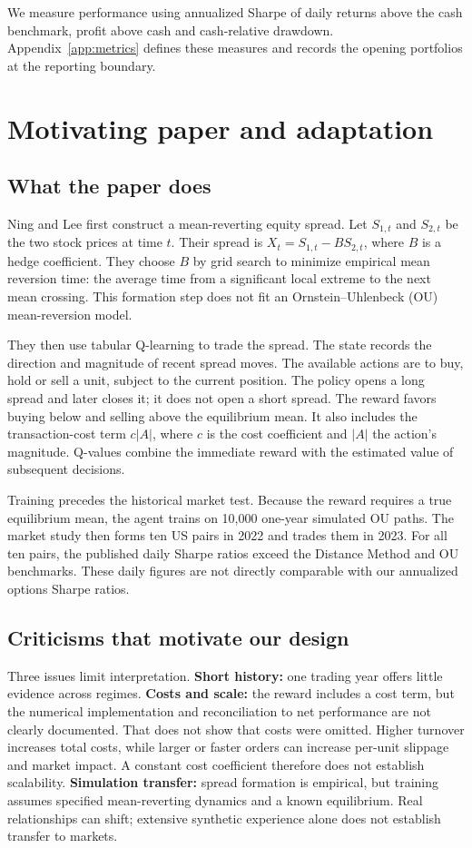 \documentclass[11pt,letterpaper]{article}
\begin{document}
We measure performance using annualized Sharpe of daily returns above the
cash benchmark, profit above cash and cash-relative drawdown.
Appendix~\ref{app:metrics} defines these measures and records the opening
portfolios at the reporting boundary.

\clearpage
\section{Motivating paper and adaptation}
\subsection*{What the paper does}
Ning and Lee \cite{ning} first construct a mean-reverting equity spread. Let
$S_{1,t}$ and $S_{2,t}$ be the two stock prices at time $t$. Their spread is
$X_t=S_{1,t}-B S_{2,t}$, where $B$ is a hedge coefficient. They choose $B$ by
grid search to minimize empirical mean reversion time: the average time from a
significant local extreme to the next mean crossing. This formation step does
not fit an Ornstein--Uhlenbeck (OU) mean-reversion model.

They then use tabular Q-learning to trade the spread. The state records the
direction and magnitude of recent spread moves. The available actions are to
buy, hold or sell a unit, subject to the current position. The policy opens a
long spread and later closes it; it does not open a short spread. The reward
favors buying below and selling above the equilibrium mean. It also includes
the transaction-cost term $c|A|$, where $c$ is the cost coefficient and $|A|$
the action's magnitude. Q-values combine the immediate reward with the estimated
value of subsequent decisions.

Training precedes the historical market test. Because the reward requires a
true equilibrium mean, the agent trains on 10,000 one-year simulated OU paths.
The market study then forms ten US pairs in 2022 and trades them in 2023. For
all ten pairs, the published daily Sharpe ratios exceed the Distance Method
and OU benchmarks. These daily figures are not directly comparable with our
annualized options Sharpe ratios.

\subsection*{Criticisms that motivate our design}
Three issues limit interpretation. \textbf{Short history:} one trading year
offers little evidence across regimes. \textbf{Costs and scale:} the reward
includes a cost term, but the numerical implementation and reconciliation to
net performance are not clearly documented. That does not show that costs
were omitted. Higher turnover increases total costs, while larger or faster
orders can increase per-unit slippage and market impact. A constant cost
coefficient therefore does not establish scalability. \textbf{Simulation transfer:}
spread formation is empirical, but training assumes specified mean-reverting
dynamics and a known equilibrium. Real relationships can shift; extensive
synthetic experience alone does not establish transfer to markets.
\end{document}
